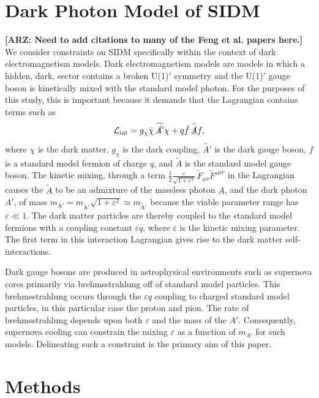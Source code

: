 \documentclass[nofootinbib,prd,superscriptaddress,twocolumn]{revtex4}
\newcommand{\arz}[1]{{{\bf{\color{BrickRed}[ARZ: #1]}}}}
\begin{document}
\section{Dark Photon Model of SIDM}
\label{section:model}

\arz{Need to add citations to many of the Feng et al. papers here.}
We consider constraints on SIDM specifically within the context of dark electromagnetism models. 
Dark electromagnetism models are models in which a hidden, dark, sector contains a broken U(1)$'$ 
symmetry and the U(1)$'$ gauge boson is kinetically mixed with the standard model photon. For the 
purposes of this study, this is important because it demands that the Lagrangian contains terms such as 
%
\begin{equation}
\mathcal{L}_{\mathrm{int}} = g_{\chi} \bar{\chi} \, \widetilde{\slashed{A'}} \chi + q \bar{f}\, \widetilde{\slashed{A}} f, 
\end{equation}
%
where $\chi$ is the dark matter, $g_{\chi}$ is the dark coupling, $\widetilde{A'}$ is the dark gauge boson, 
$f$ is a standard model fermion of charge $q$, and $\widetilde{A}$ is the standard model gauge boson. 
The kinetic mixing, through a term 
$\frac{1}{2}\frac{\varepsilon}{\sqrt{1+\varepsilon^2}}\, \widetilde{F}_{\mu \nu}\widetilde{F}'^{\mu \nu}$ 
in the Lagrangian causes the $\widetilde{A}$ to be an admixture of the massless photon $A$, 
and the dark photon $A'$, 
of mass $m_{\mathrm{A'}} = m_{\mathrm{\widetilde{A}'}} \sqrt{1 + \varepsilon^2} \simeq m_\mathrm{{\widetilde{A}'}}$ because 
the viable parameter range has $\varepsilon \ll 1$. The dark matter particles are thereby coupled 
to the standard model fermions with a coupling constant $\varepsilon q$, 
where $\varepsilon$ is the kinetic mixing parameter. The first term in this 
interaction Lagrangian gives rise to the dark matter self-interactions. 

Dark gauge bosons are produced in astrophysical environments such as supernova 
cores primarily via brehmsstrahlung off of standard model particles. This brehmsstrahlung 
occurs through the $\varepsilon q$ coupling to charged standard model particles, 
in this  particular case the proton and pion. The rate of brehmsstrahlung 
depends upon both $\varepsilon$ and the mass of the $A'$. Consequently, 
supernova cooling can constrain the mixing $\varepsilon$ as a function of 
$m_{A'}$ for such models. Delineating such a constraint is the 
primary aim of this paper.


\section{Methods}
\label{section:computational}
	
\end{document}
